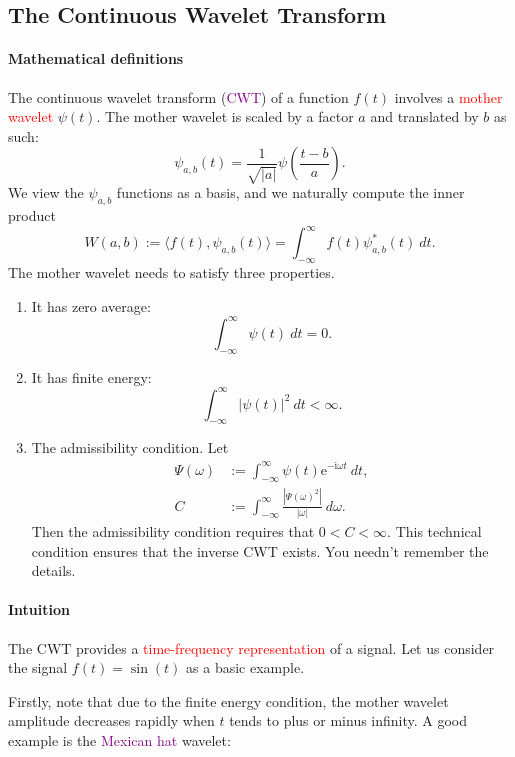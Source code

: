 \documentclass[a4paper, 11pt, openany]{book}
\numberwithin{equation}{section}
\theoremstyle{plain}
\theoremstyle{definition}
\renewcommand{\i}{\mathrm{i}}
\newcommand{\e}{\mathrm{e}}
\newcommand{\Important}[1]{\textcolor{red}{#1}}
\newcommand{\Define}[1]{\textcolor{purple}{#1}}
\begin{document}
\subsection{The Continuous Wavelet Transform}

\paragraph{Mathematical definitions} 
The continuous wavelet transform (\Define{CWT}) of a function $f(t)$ involves a \Important{mother wavelet} $\psi(t)$. The mother wavelet is scaled by a factor $a$ and translated by $b$ as such:
\[
    \psi_{a,b}(t) = \frac{1}{\sqrt{|a|}} \psi \left( \frac{t-b}{a} \right).
\]
We view the $\psi_{a,b}$ functions as a basis, and we naturally compute the inner product
\[
    W(a,b) := \langle f(t), \psi_{a,b}(t)  \rangle = \int_{-\infty}^\infty f(t) \psi^*_{a,b}(t) \ dt.
\]
The mother wavelet needs to satisfy three properties.
\begin{enumerate}
    \item It has zero average:
    \[
        \int_{-\infty}^\infty \psi(t) \ dt = 0.
    \]
    
    \item It has finite energy:
    \[
        \int_{-\infty}^\infty |\psi(t)|^2 \ dt < \infty. 
    \]
    
    \item The admissibility condition. Let
    \begin{align*}
        \Psi(\omega) &:= \int_{-\infty}^\infty \psi(t) \e^{-\i \omega t} \ dt,\\
        C &:= \int_{-\infty}^\infty \frac{ |\Psi(\omega)^2| }{ |\omega| } \ d\omega.
    \end{align*}
    Then the admissibility condition requires that $0 < C < \infty$. This technical condition ensures that the inverse CWT exists. You needn't remember the details.
\end{enumerate}

\paragraph{Intuition}
The CWT provides a \Important{time-frequency representation} of a signal. Let us consider the signal $f(t) = \sin (t)$ as a basic example. 

Firstly, note that due to the finite energy condition, the mother wavelet amplitude decreases rapidly when $t$ tends to plus or minus infinity. A good example is the \Define{Mexican hat} wavelet:
\end{document}
